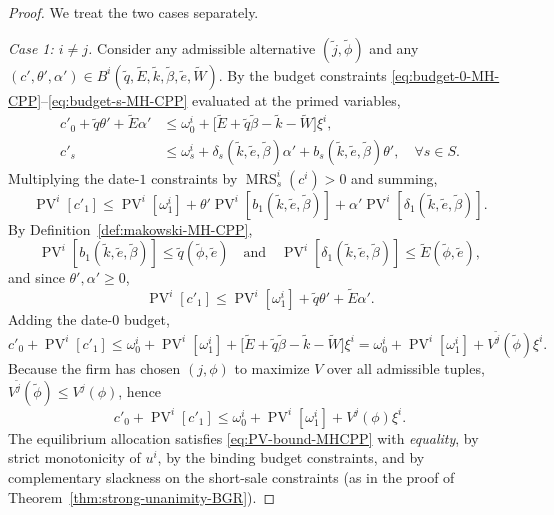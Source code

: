 \documentclass[11pt,a4paper,oneside]{book}
\def\leq{\leqslant}
\def\geq{\geqslant}
\def\et{\quad \text{and} \quad}
\DeclareMathOperator{\MRS}{MRS}
\DeclareMathOperator{\PV}{PV}
\theoremstyle{plain}
\theoremstyle{definition}
\theoremstyle{remark}
\numberwithin{equation}{chapter}
\begin{document}
\begin{proof}
We treat the two cases separately.

\emph{Case 1: $i \neq j$.}
Consider any admissible alternative $(\widetilde{j}, \widetilde{\phi})$ and any $(c', \theta', \alpha') \in B^i(\widetilde{q}, \widetilde{E}, \widetilde{k}, \widetilde{\beta}, \widetilde{e}, \widetilde{W})$.
By the budget constraints \eqref{eq:budget-0-MH-CPP}--\eqref{eq:budget-s-MH-CPP} evaluated at the primed variables,
\begin{align*}
  c'_0 + \widetilde{q} \theta' + \widetilde{E} \alpha'
  &\leq \omega^i_0 + \bigl[ \widetilde{E} + \widetilde{q} \widetilde{\beta} - \widetilde{k} - \widetilde{W} \bigr] \xi^i, \\
  c'_s
  &\leq \omega^i_s + \delta_s(\widetilde{k}, \widetilde{e}, \widetilde{\beta}) \alpha' + b_s(\widetilde{k}, \widetilde{e}, \widetilde{\beta}) \theta', \quad \forall s \in S.
\end{align*}
Multiplying the date-$1$ constraints by $\MRS^i_s(c^i) > 0$ and summing,
\begin{equation*}
  \PV^i[c'_1]
  \leq \PV^i[\omega^i_1] + \theta' \PV^i[b_1(\widetilde{k}, \widetilde{e}, \widetilde{\beta})] + \alpha' \PV^i[\delta_1(\widetilde{k}, \widetilde{e}, \widetilde{\beta})].
\end{equation*}
By Definition~\ref{def:makowski-MH-CPP},
\begin{equation*}
  \PV^i[b_1(\widetilde{k}, \widetilde{e}, \widetilde{\beta})] \leq \widetilde{q}(\widetilde{\phi}, \widetilde{e})
  \et
  \PV^i[\delta_1(\widetilde{k}, \widetilde{e}, \widetilde{\beta})] \leq \widetilde{E}(\widetilde{\phi}, \widetilde{e}),
\end{equation*}
and since $\theta', \alpha' \geq 0$,
\begin{equation*}
  \PV^i[c'_1] \leq \PV^i[\omega^i_1] + \widetilde{q} \theta' + \widetilde{E} \alpha'.
\end{equation*}
Adding the date-$0$ budget,
\begin{equation*}
  c'_0 + \PV^i[c'_1]
  \leq \omega^i_0 + \PV^i[\omega^i_1] + \bigl[ \widetilde{E} + \widetilde{q} \widetilde{\beta} - \widetilde{k} - \widetilde{W} \bigr] \xi^i
  = \omega^i_0 + \PV^i[\omega^i_1] + V^{\widetilde{j}}(\widetilde{\phi}) \xi^i.
\end{equation*}
Because the firm has chosen $(j, \phi)$ to maximize $V$ over all admissible tuples, $V^{\widetilde{j}}(\widetilde{\phi}) \leq V^j(\phi)$, hence
\begin{equation}\label{eq:PV-bound-MHCPP}
  c'_0 + \PV^i[c'_1]
  \leq \omega^i_0 + \PV^i[\omega^i_1] + V^j(\phi) \xi^i.
\end{equation}
The equilibrium allocation satisfies \eqref{eq:PV-bound-MHCPP} with \emph{equality}, by strict monotonicity of $u^i$, by the binding budget constraints, and by complementary slackness on the short-sale constraints (as in the proof of Theorem~\ref{thm:strong-unanimity-BGR}).


\end{proof}
\end{document}
